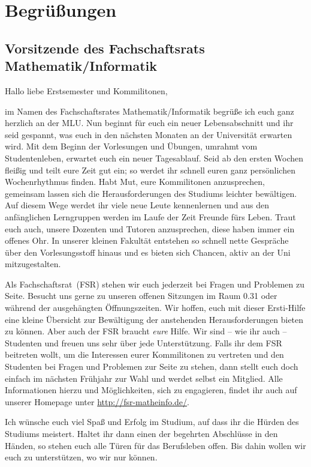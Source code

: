 \section{Begrüßungen}

\subsection*{Vorsitzende des Fachschaftsrats Mathematik/Informatik}

Hallo liebe Erstsemester und Kommilitonen,

im Namen des Fachschaftsrates Mathematik/Informatik 
begrüße ich euch ganz herzlich 
an der MLU.
Nun beginnt für euch ein neuer Lebensabschnitt 
und ihr seid gespannt, 
was euch in den nächsten Monaten 
an der Universität erwarten wird. 
Mit dem Beginn der Vorlesungen 
und Übungen, umrahmt 
vom Studentenleben, 
erwartet euch ein neuer Tagesablauf. 
Seid ab den ersten Wochen fleißig 
und teilt eure Zeit gut ein; 
so werdet ihr schnell 
euren ganz persönlichen Wochenrhythmus finden.
Habt Mut, eure Kommilitonen anzusprechen, 
gemeinsam lassen sich die Herausforderungen des Studiums 
leichter bewältigen. 
Auf diesem Wege werdet ihr viele neue Leute kennenlernen 
und aus den anfänglichen Lerngruppen 
werden im Laufe der Zeit Freunde fürs Leben. 
Traut euch auch, unsere Dozenten und Tutoren anzusprechen,
diese haben immer ein offenes Ohr.
In unserer kleinen Fakultät entstehen so schnell 
nette Gespräche über den Vorlesungsstoff 
hinaus und es bieten sich Chancen,
aktiv an der Uni mitzugestalten.

Als Fachschaftsrat~(FSR) stehen wir euch jederzeit 
bei Fragen und Problemen zu Seite. 
Besucht uns gerne zu unseren offenen Sitzungen im Raum 0.31
oder während der ausgehängten Öffnungszeiten.
Wir hoffen, euch mit dieser Ersti-Hilfe 
eine kleine Übersicht zur Bewältigung 
der anstehenden Herausforderungen bieten zu können.
Aber auch der FSR braucht \emph{eure} Hilfe. 
Wir sind -- wie ihr auch -- Studenten 
und freuen uns sehr über jede Unterstützung. 
Falls ihr dem FSR beitreten wollt, 
um die Interessen eurer Kommilitonen zu vertreten 
und den Studenten bei Fragen und Problemen zur Seite zu stehen, 
dann stellt euch doch einfach im nächsten Frühjahr zur Wahl 
und werdet selbst ein Mitglied. 
Alle Informationen hierzu 
und Möglichkeiten, sich zu engagieren, 
findet ihr auch auf unserer Homepage 
unter \mbox{\url{http://fsr-matheinfo.de/}}.

Ich wünsche euch viel Spaß und Erfolg im Studium,
auf dass ihr die Hürden des Studiums meistert. 
Haltet ihr dann einen der begehrten Abschlüsse 
in den Händen, so stehen euch alle Türen 
für das Berufsleben offen. 
Bis dahin wollen wir euch zu unterstützen, 
wo wir nur können.


